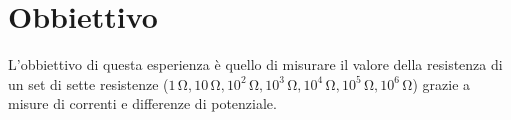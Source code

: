 \section*{Obbiettivo}

L'obbiettivo di questa esperienza è quello di misurare il valore della resistenza di un set di sette resistenze ($1\,\si{\ohm}, 10\,\si{\ohm}, 10^2\,\si{\ohm}, 10^3\,\si{\ohm}, 10^4\,\si{\ohm}, 10^5\,\si{\ohm}, 10^6\,\si{\ohm}$) grazie a misure di correnti e differenze di potenziale.